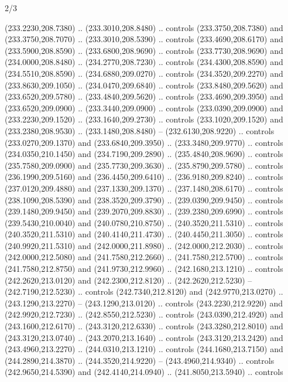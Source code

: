 \begin{flagdescription}{2/3}
\begin{scope}[xshift=0.5\flaglength,yshift=0.5\flagwidth,scale=\flagwidth/259.2]
\begin{scope}[y=0.8pt, x=0.8pt, yscale=-1,shift={(-243,-162)}]
      (233.2230,208.7380) .. (233.3010,208.8480) .. controls (233.3750,208.7380) and
      (233.3750,208.7070) .. (233.3010,208.5390) .. controls (233.4690,208.6170) and
      (233.5900,208.8590) .. (233.6800,208.9690) .. controls (233.7730,208.9690) and
      (234.0000,208.8480) .. (234.2770,208.7230) .. controls (234.4300,208.8590) and
      (234.5510,208.8590) .. (234.6880,209.0270) .. controls (234.3520,209.2270) and
      (233.8630,209.1050) .. (234.0470,209.6840) .. controls (233.8480,209.5620) and
      (233.6520,209.5780) .. (233.4840,209.5620) .. controls (233.4690,209.3950) and
      (233.6520,209.0900) .. (233.3440,209.0900) .. controls (233.0390,209.0900) and
      (233.2230,209.1520) .. (233.1640,209.2730) .. controls (233.1020,209.1520) and
      (233.2380,208.9530) .. (233.1480,208.8480) -- (232.6130,208.9220) .. controls
      (233.0270,209.1370) and (233.6840,209.3950) .. (233.3480,209.9770) .. controls
      (234.0350,210.1450) and (234.7190,209.2890) .. (235.4840,208.9690) .. controls
      (235.7580,209.0900) and (235.7730,209.3630) .. (235.8790,209.5780) .. controls
      (236.1990,209.5160) and (236.4450,209.6410) .. (236.9180,209.8240) .. controls
      (237.0120,209.4880) and (237.1330,209.1370) .. (237.1480,208.6170) .. controls
      (238.1090,208.5390) and (238.3520,209.3790) .. (239.0390,209.9450) .. controls
      (239.1480,209.9450) and (239.2070,209.8830) .. (239.2380,209.6990) .. controls
      (239.5430,210.0040) and (240.0780,210.8750) .. (240.3520,211.5310) .. controls
      (240.3520,211.5310) and (240.4140,211.4730) .. (240.4450,211.3050) .. controls
      (240.9920,211.5310) and (242.0000,211.8980) .. (242.0000,212.2030) .. controls
      (242.0000,212.5080) and (241.7580,212.2660) .. (241.7580,212.5700) .. controls
      (241.7580,212.8750) and (241.9730,212.9960) .. (242.1680,213.1210) .. controls
      (242.2620,213.0120) and (242.2300,212.8120) .. (242.2620,212.5230) --
      (242.7190,212.5230) .. controls (242.7340,212.8120) and (242.9770,213.0270) ..
      (243.1290,213.2270) -- (243.1290,213.0120) .. controls (243.2230,212.9220) and
      (242.9920,212.7230) .. (242.8550,212.5230) .. controls (243.0390,212.4920) and
      (243.1600,212.6170) .. (243.3120,212.6330) .. controls (243.3280,212.8010) and
      (243.3120,213.0740) .. (243.2070,213.1640) .. controls (243.3120,213.2420) and
      (243.4960,213.2270) .. (244.0310,213.1210) .. controls (244.1680,213.7150) and
      (244.2890,214.3870) .. (244.3520,214.9220) -- (243.4960,214.9340) .. controls
      (242.9650,214.5390) and (242.4140,214.0940) .. (241.8050,213.5940) .. controls

\end{scope}
\end{scope}
\end{flagdescription}

